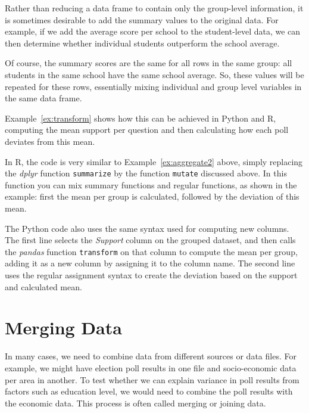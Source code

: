 Rather than reducing a data frame to contain only the group-level information,
it is sometimes desirable to add the summary values to the original data.
For example, if we add the average score per school to the student-level data,
we can then determine whether individual students outperform the school average.

Of course, the summary scores are the same for all rows in the same group:
all students in the same school have the same school average.
So, these values will be repeated for these rows, essentially
mixing individual and group level variables in the same data frame.


Example~\ref{ex:transform} shows how this can be achieved in Python and R,
computing the mean support per question and then calculating how each poll deviates from this mean.

In R, the code is very similar to Example~\ref{ex:aggregate2} above, simply
replacing the \emph{dplyr} function \texttt{summarize} by the function \texttt{mutate} discussed above.
In this function you can mix summary functions and regular functions, as shown in the example:
first the mean per group is calculated, followed by the deviation of this mean.

The Python code also uses the same syntax used for computing new columns.
The first line selects the \emph{Support} column on the grouped dataset,
and then calls the \emph{pandas} function \texttt{transform} on that column to compute the mean per group,
adding it as a new column by assigning it to the column name.
The second line uses the regular assignment syntax to create the deviation based on the support and calculated mean.

\section{Merging Data}
\label{sec:join}

In many cases, we need to combine data from different sources or data files.
For example, we might have election poll results in one file and socio-economic data per area in another.
To test whether we can explain variance in poll results from factors such as education level,
we would need to combine the poll results with the economic data.
This process is often called merging or joining data.

